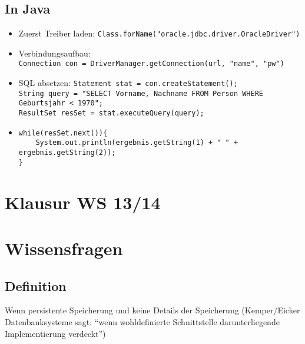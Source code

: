 \documentclass[a4paper, 12pt]{scrartcl}
\begin{document}
\subsection{In Java}
\begin{itemize}
	\item
		Zuerst Treiber laden: \lstinline$Class.forName("oracle.jdbc.driver.OracleDriver")$
	\item
		Verbindungsaufbau:\\ \lstinline$Connection con = DriverManager.getConnection(url, "name", "pw")$
	\item
		SQL absetzen: \lstinline$Statement stat = con.createStatement();$\\
		\lstinline$String query = "SELECT Vorname, Nachname FROM Person WHERE Geburtsjahr < 1970";$\\
		\lstinline$ResultSet resSet = stat.executeQuery(query);$
	\item
		\begin{lstlisting}
while(resSet.next()){
	System.out.println(ergebnis.getString(1) + " " + ergebnis.getString(2));
}
		\end{lstlisting}
\end{itemize}







\newpage
\section{Klausur WS 13/14}
\setcounter{section}{0}
\section{Wissensfragen}
\subsection{Definition}
Wenn persistente Speicherung und keine Details der Speicherung (Kemper/Eicker Datenbanksysteme sagt: \enquote{wenn wohldefinierte Schnittstelle darunterliegende Implementierung verdeckt})
\end{document}
